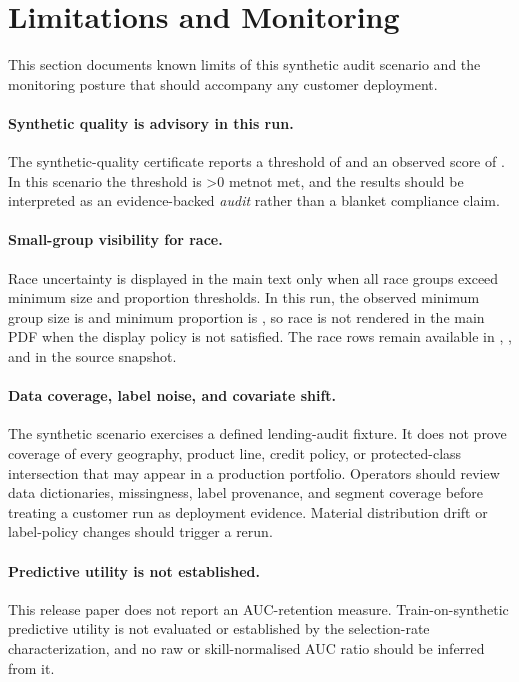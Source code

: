\section{Limitations and Monitoring}
This section documents known limits of this synthetic audit scenario and the monitoring posture that should accompany any customer deployment.

\paragraph{Synthetic quality is advisory in this run.}
The synthetic-quality certificate reports a threshold of \SqThresholdUsed{} and an observed score of \SqScore{}. In this scenario the threshold is \ifnum\SqThresholdMet>0 met\else not met\fi, and the results should be interpreted as an evidence-backed \emph{audit} rather than a blanket compliance claim.

\paragraph{Small-group visibility for race.}
Race uncertainty is displayed in the main text only when all race groups exceed minimum size and proportion thresholds. In this run, the observed minimum group size is \RaceObservedMinGroupN{} and minimum proportion is \RaceObservedMinGroupPct{}, so race is not rendered in the main PDF when the display policy is not satisfied. The race rows remain available in , , and  in the source snapshot.

\paragraph{Data coverage, label noise, and covariate shift.}
The synthetic scenario exercises a defined lending-audit fixture. It does not prove coverage of every geography, product line, credit policy, or protected-class intersection that may appear in a production portfolio. Operators should review data dictionaries, missingness, label provenance, and segment coverage before treating a customer run as deployment evidence. Material distribution drift or label-policy changes should trigger a rerun.

\paragraph{Predictive utility is not established.}
This release paper does not report an AUC-retention measure. Train-on-synthetic predictive utility is not evaluated or established by the selection-rate characterization, and no raw or skill-normalised AUC ratio should be inferred from it.

